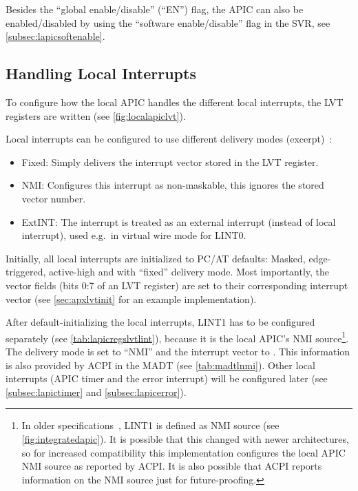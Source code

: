 Besides the ``global enable/disable'' (``EN'') flag, the APIC can also be enabled/disabled by using
the ``software enable/disable'' flag in the SVR, see \autoref{subsec:lapicsoftenable}.

\subsection{Handling Local Interrupts}
\label{subsec:lapiclvtinit}

To configure how the local APIC handles the different local interrupts, the LVT registers are
written (see \autoref{fig:localapiclvt}).

Local interrupts can be configured to use different delivery modes
(excerpt)~\cite[sec.~3.11.5.1]{ia32}:

\begin{itemize}
  \item Fixed: Simply delivers the interrupt vector stored in the LVT register.
  \item NMI: Configures this interrupt as non-maskable, this ignores the stored vector number.
  \item ExtINT: The interrupt is treated as an external interrupt (instead of local interrupt), used e.g.\
        in virtual wire mode for LINT0.
\end{itemize}

Initially, all local interrupts are initialized to PC/AT defaults: Masked, edge-triggered,
active-high and with ``fixed'' delivery mode. Most importantly, the vector fields (bits 0:7 of an
LVT register) are set to their corresponding interrupt vector (see \autoref{sec:apxlvtinit} for an
example implementation).

After default-initializing the local interrupts, LINT1 has to be configured separately (see
\autoref{tab:lapicregslvtlint}), because it is the local APIC's NMI source\footnote{In older
  specifications~\cite{mpspec}, LINT1 is defined as NMI source (see \autoref{fig:integratedapic}). It
  is possible that this changed with newer architectures, so for increased compatibility this
  implementation configures the local APIC NMI source as reported by ACPI. It is also possible that
  ACPI reports information on the NMI source just for future-proofing.}. The delivery mode is set to
``NMI'' and the interrupt vector to \code{0x00}. This information is also provided by ACPI in the
MADT (see \autoref{tab:madtlnmi}). Other local interrupts (APIC timer and the error interrupt) will
be configured later (see \autoref{subsec:lapictimer} and \autoref{subsec:lapicerror}).

